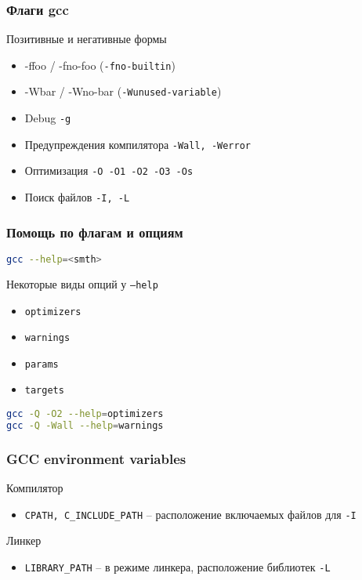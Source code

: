\begin{frame}
\frametitle{Флаги gcc}

	\begin{block}{Позитивные и негативные формы}
		\begin{itemize}
			\item -ffoo / -fno-foo ({\tt -fno-builtin})
			\item -Wbar / -Wno-bar ({\tt -Wunused-variable})
		\end{itemize}
	\end{block}


	\begin{itemize}
	  \item Debug {\tt -g}
	  \item Предупреждения компилятора {\tt -Wall, -Werror}
	  \item Оптимизация {\tt -O -O1 -O2 -O3 -Os}
      \item Поиск файлов {\tt -I, -L}
	\end{itemize}
\end{frame}

\begin{frame}[fragile]
  \frametitle{Помощь по флагам и опциям}
\begin{lstlisting}[language=sh]
gcc --help=<smth>
\end{lstlisting}
\begin{block}{Некоторые виды опций у \texttt{--help}}
  \begin{itemize}
    \item \texttt{optimizers}
    \item \texttt{warnings}
    \item \texttt{params}
    \item \texttt{targets}
  \end{itemize}
\end{block}
\begin{lstlisting}[language=sh]
gcc -Q -O2 --help=optimizers
gcc -Q -Wall --help=warnings
\end{lstlisting}
\end{frame}

\begin{frame}[fragile]
	\frametitle{GCC environment variables}

	\begin{block}{Компилятор}
		\begin{itemize}
		    \item {\tt CPATH, C\_INCLUDE\_PATH} -- расположение включаемых файлов для {\tt -I}
		\end{itemize}
	\end{block}
    \begin{block}{Линкер}
      \begin{itemize}
          \item {\tt LIBRARY\_PATH} -- в режиме линкера, расположение библиотек {\tt -L} 
      \end{itemize}
    \end{block}
\end{frame}

